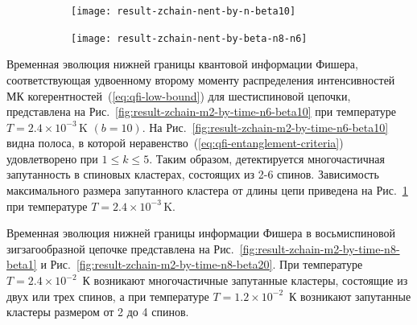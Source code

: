 

\begin{figure}[H]
  \begin{subfigure}[t]{0.48\textwidth}
    \centering
    \texttt{[image: result-zchain-nent-by-n-beta10]}
    \caption{}
    \label{fig:result-zchain-nent-by-n-beta10}
  \end{subfigure}
  \hfill
  \begin{subfigure}[t]{0.48\textwidth}
    \centering
    \texttt{[image: result-zchain-nent-by-beta-n8-n6]}
    \caption{}
    \label{fig:result-zchain-nent-by-beta-n8-n6}
  \end{subfigure}
  \label{fig:result-zchain-nent-by-betaand-n}
  \caption{\protect}
\end{figure}

Временная эволюция нижней границы квантовой информации Фишера,
соответствующая  удвоенному второму моменту распределения интенсивностей МК когерентностей~(\ref{eq:qfi-low-bound}) для шестиспиновой цепочки, представлена на Рис.~\ref{fig:result-zchain-m2-by-time-n6-beta10} при температуре $T = 2.4\times 10^{-3}\,\mbox{K}$ $(b=10)$.
На Рис.~\ref{fig:result-zchain-m2-by-time-n6-beta10} видна полоса,
в которой неравенство~(\ref{eq:qfi-entanglement-criteria}) удовлетворено при $1\leqslant k \leqslant 5$.
Таким образом, детектируется многочастичная запутанность в спиновых кластерах, состоящих из 2-6 спинов.
Зависимость максимального размера запутанного кластера от длины цепи приведена на Рис.~\ref{fig:result-zchain-nent-by-n-beta10} при температуре $T = 2.4\times 10^{-3}\,\mbox{K}$.

Временная эволюция нижней границы информации Фишера в восьмиспиновой зигзагообразной цепочке представлена на Рис.~\ref{fig:result-zchain-m2-by-time-n8-beta1}
и Рис.~\ref{fig:result-zchain-m2-by-time-n8-beta20}.
При температуре $T=2.4\times 10^{-2}$~К возникают многочастичные запутанные кластеры,
состоящие из двух или трех спинов,
а при температуре $T=1.2\times 10^{-2}$~К возникают запутанные кластеры размером от 2 до 4 спинов.

